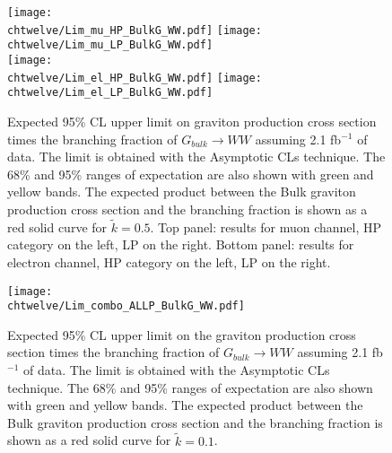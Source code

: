 \begin{figure}[htbp]
\centering
\texttt{[image: \\chtwelve/Lim\_mu\_HP\_BulkG\_WW.pdf]}
\texttt{[image: \\chtwelve/Lim\_mu\_LP\_BulkG\_WW.pdf]}\\
\texttt{[image: \\chtwelve/Lim\_el\_HP\_BulkG\_WW.pdf]}
\texttt{[image: \\chtwelve/Lim\_el\_LP\_BulkG\_WW.pdf]}\\
\caption{Expected 95\% CL upper limit on graviton production cross section times the branching fraction of $G_{bulk} \rightarrow WW$ assuming 2.1 fb$^{-1}$ of data. The limit is obtained with the Asymptotic CLs technique. The 68\% and 95\% ranges of expectation are
also shown with green and yellow bands. The expected product between the Bulk graviton
production cross section and the branching fraction is shown as a red solid curve for $\tilde{k} = 0.5$.
Top panel: results for muon channel, HP category on the left, LP on the right. Bottom panel: results for electron channel, HP category on the left, LP on the right.
}
\label{fig:limits_1}
\end{figure}

\begin{figure}[htbp]
\centering
\texttt{[image: \\chtwelve/Lim\_combo\_ALLP\_BulkG\_WW.pdf]}
\caption{Expected 95\% CL upper limit on the graviton production cross section times the branching fraction of $G_{bulk} \rightarrow WW$ assuming 2.1 fb$^{-1}$ of data. The limit is obtained with the Asymptotic CLs technique. The 68\% and 95\% ranges of expectation are also shown with green and yellow bands. The expected product between the Bulk graviton production cross section and the branching fraction is shown as a red solid curve for $\tilde{k} = 0.1$.}
\label{fig:limits_2}
\end{figure}



